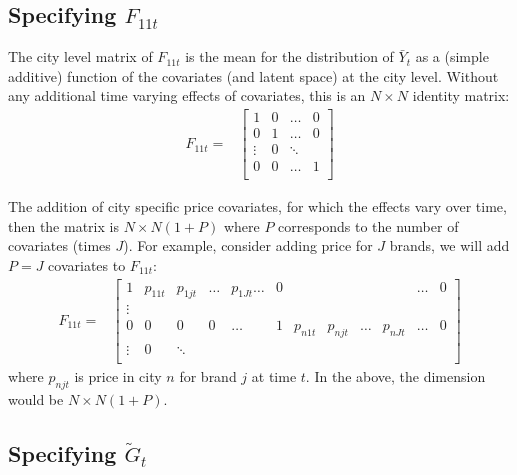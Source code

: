 \documentclass[letter,10pt]{article}
\begin{document}
\subsection{Specifying $F_{11t}$}

The city level matrix of $F_{11t}$ is the mean for the distribution of $\bar{Y}_t$ as a (simple additive) function
of the covariates (and latent space) at the city level.  Without any additional time varying effects of covariates,
this is an $N\times N$ identity matrix:
\begin{equation}
\begin{array}{ll}
      F_{11t} = & \left[\begin{array}{cccl}
		 1 & 0 & \ldots & 0 \\
		0 & 1 & \ldots & 0 \\
\vdots & 0 & \ddots \\
		0 & 0 & \ldots & 1 \\

		\end{array}\right]
\end{array}
\end{equation}

The addition of city specific price covariates, for which the effects vary over time, then the matrix is $N\times N(1+P)$
where $P$ corresponds to the number of covariates (times $J$).  For example, consider adding price for $J$ brands,
we will add $P=J$ covariates to $F_{11t}$:
\begin{equation}
\begin{array}{ll}
      F_{11t} = & \left[\begin{array}{cccccccccccc}
		 1 & p_{11t} & p_{1jt} & \ldots &p_{1Jt}\ldots & 0 &&&&&\ldots &0\\
\vdots\\
		0 &0 &0 &0 &\ldots & 1 & p_{n1t} & p_{njt} & \ldots &p_{nJt}  & \ldots & 0 \\
\vdots & 0 & \ddots \\
		\end{array}\right]
\end{array}
\end{equation}
where $p_{njt}$ is price in city $n$ for brand $j$ at time $t$.   In the above, the dimension would be $N \times N(1+P)$.


\subsection{Specifying $\tilde{G}_t$}
\end{document}
